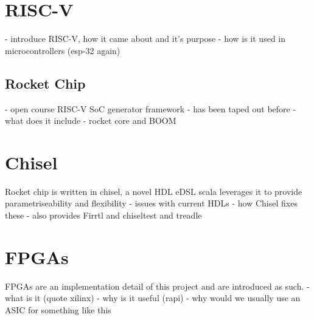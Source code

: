 \section{RISC-V}
- introduce RISC-V, how it came about and it's purpose
- how is it used in microcontrollers (esp-32 again)

\subsection{Rocket Chip}
- open course RISC-V SoC generator framework
- has been taped out before
- what does it include
- rocket core and BOOM

\section{Chisel}
Rocket chip is written in chisel, a novel HDL eDSL scala
leverages it to provide parametriseability and flexibility
- issues with current HDLs
- how Chisel fixes these
- also provides Firrtl and chiseltest and treadle

\section{FPGAs}
FPGAs are an implementation detail of this project and are introduced as such.
- what is it (quote xilinx)
- why is it useful (rapi)
- why would we usually use an ASIC for something like this
